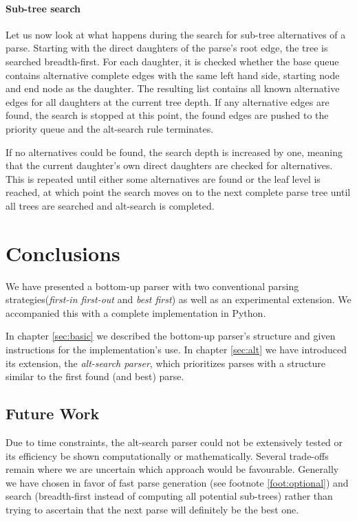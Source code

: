 \documentclass[11pt, titlepage, a4paper]{scrartcl}		%
\newcommand{\xmas}[1]{alt-search#1}
\begin{document}
\paragraph{Sub-tree search}
Let us now look at what happens during the search for sub-tree alternatives of a parse.
Starting with the direct daughters of the parse's root edge, the tree is searched breadth-first.
For each daughter, it is checked whether the base queue contains alternative complete edges with the same left hand side, starting node and end node as the daughter. The resulting list contains all known alternative edges for all daughters at the current tree depth.
If any alternative edges are found, the search is stopped at this point, the found edges are pushed to the priority queue and the \xmas{} rule terminates.

If no alternatives could be found, the search depth is increased by one, meaning that the current daughter's own direct daughters are checked for alternatives. This is repeated until either some alternatives are found or the leaf level is reached, at which point the search moves on to the next complete parse tree until all trees are searched and \xmas{} is completed.

\section{Conclusions}
We have presented a bottom-up parser with two conventional parsing strategies(\textit{first-in first-out} and \textit{best first}) as well as an experimental extension. We accompanied this with a complete implementation in Python.

In chapter \ref{sec:basic} we described the bottom-up parser's structure and given instructions for the implementation's use. In chapter \ref{sec:alt} we have introduced its extension, the \textit{\xmas{} parser}, which prioritizes parses with a structure similar to the first found (and best) parse.

\subsection{Future Work}
Due to time constraints, the \xmas{} parser could not be extensively tested or its efficiency be shown computationally or mathematically. Several trade-offs remain where we are uncertain which approach would be favourable. Generally we have chosen in favor of fast parse generation (see footnote \ref{foot:optional}) and search (breadth-first instead of computing all potential sub-trees) rather than trying to ascertain that the next parse will definitely be the best one.
\end{document}
